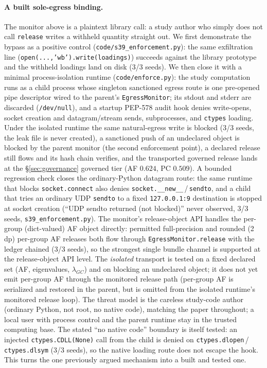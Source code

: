 \documentclass[11pt]{article}
\begin{document}
\paragraph{A built sole-egress binding.} The monitor above is a plaintext
library call: a study author who simply does not call \texttt{release} writes a
withheld quantity straight out. We first demonstrate the bypass as a positive
control (\texttt{code/s39\_enforcement.py}): the same exfiltration line
(\texttt{open(...,'wb').write(loadings)}) succeeds against the library prototype
and the withheld loadings land on disk (3/3 seeds). We then close it with a
minimal process-isolation runtime (\texttt{code/enforce.py}): the study
computation runs as a child process whose singleton sanctioned egress route is
one pre-opened pipe descriptor wired to the parent's \texttt{EgressMonitor}; its
stdout and stderr are discarded (\texttt{/dev/null}), and a
startup PEP-578 audit hook denies write-opens, socket creation and
datagram/stream sends, subprocesses, and
\texttt{ctypes} loading. Under the isolated runtime the same natural-egress
write is blocked (3/3 seeds, the leak file is never created), a sanctioned push
of an undeclared object is blocked by the parent monitor (the second enforcement
point), a declared release still flows and its hash chain verifies, and the
transported governed release lands at the \S\ref{sec:governance} governed tier
(AF $0.624$, PC $0.509$). A bounded regression check closes the ordinary-Python
datagram route: the same runtime that blocks \texttt{socket.connect} also denies
\texttt{socket.\_\_new\_\_}\,/\,\texttt{sendto}, and a child that tries an
ordinary UDP \texttt{sendto} to a fixed \texttt{127.0.0.1:9} destination is
stopped at socket creation
(``UDP sendto returned (not blocked)'' never observed, 3/3 seeds,
\texttt{s39\_enforcement.py}). The monitor's release-object API handles the
per-group (dict-valued) AF object directly: permitted full-precision and rounded
(2\,dp) per-group AF releases both flow through \texttt{EgressMonitor.release}
with the ledger chained (3/3 seeds), so the strongest single bundle channel is
supported at the release-object API level. The \emph{isolated} transport is
tested on a fixed declared set (AF, eigenvalues, $\lambda_{GC}$) and on blocking
an undeclared object; it does not yet emit per-group AF through the monitored
release path (per-group AF is serialized and restored in the parent, but is
omitted from the isolated runtime's monitored release loop).
The threat model is the careless study-code author
(ordinary Python, not root, no native code), matching the paper throughout; a
local user with process control and the parent runtime stay in the trusted
computing base. The stated ``no native code'' boundary is itself tested: an
injected \texttt{ctypes.CDLL(None)} call from the child is denied on
\texttt{ctypes.dlopen}\,/\,\texttt{ctypes.dlsym} (3/3 seeds), so the native
loading route does not escape the hook. This turns the one previously argued
mechanism into a built and tested one.
\end{document}
